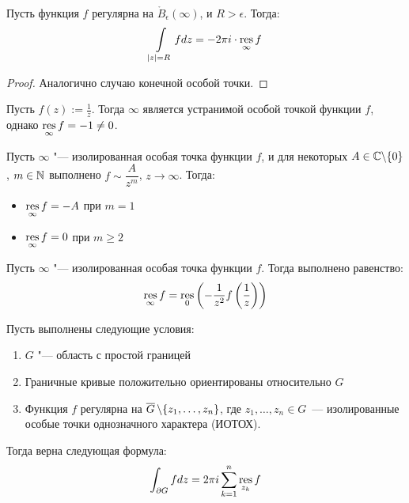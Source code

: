 \begin{proposition}
	Пусть функция $f$ регулярна на $\mathring B_\epsilon(\infty)$, и $R > \epsilon$. Тогда:
	\[\int\limits_{|z| = R}fdz = -2\pi i\cdot \operatorname*{res}_\infty f\]
\end{proposition}

\begin{proof}
	Аналогично случаю конечной особой точки.
\end{proof}

\begin{unnecessary}
    \begin{example}
    	Пусть $f(z) := \frac 1z$. Тогда $\infty$ является устранимой особой точкой функции $f$, однако $\operatorname*{res}\limits_\infty{f} = -1 \ne 0$.
    \end{example}
    
    \begin{proposition}
    	Пусть $\infty$ "--- изолированная особая точка функции $f$, и для некоторых $A \in \mathbb{C} \backslash \{0\}$, $m \in \mathbb{N}$ выполнено $f \sim \dfrac{A}{z^m}$, $z \to \infty$. Тогда:
    	\begin{itemize}
    		\item $\operatorname*{res}\limits_\infty f = -A$ при $m = 1$
    		\item $\operatorname*{res}\limits_\infty f = 0$ при $m \ge 2$
    	\end{itemize}
    \end{proposition}
    
    \begin{proposition}
    	Пусть $\infty$ "--- изолированная особая точка функции $f$. Тогда выполнено равенство:
    	\[\operatorname*{res}_\infty f = \operatorname*{res}_0\left(-\frac1{z^2}f\left(\frac1z\right)\right)\]
    \end{proposition}
\end{unnecessary}

\begin{theorem}
	Пусть выполнены следующие условия:
	\begin{enumerate}
		\item $G$ "--- область с простой границей
		
		\item Граничные кривые положительно ориентированы относительно $G$
		
		\item Функция $f$ регулярна на $\overline{G}\,\backslash \{z_1, \dotsc, z_n\}$, где $z_1, \dotsc, z_n \in G$~--- изолированные особые точки однозначного характера (ИОТОХ).
	\end{enumerate}
	
	Тогда верна следующая формула:
	\[\int_{\partial G}fdz = 2\pi i\sum\limits_{k = 1}^n\operatorname*{res}_{z_k}f\]
\end{theorem}

